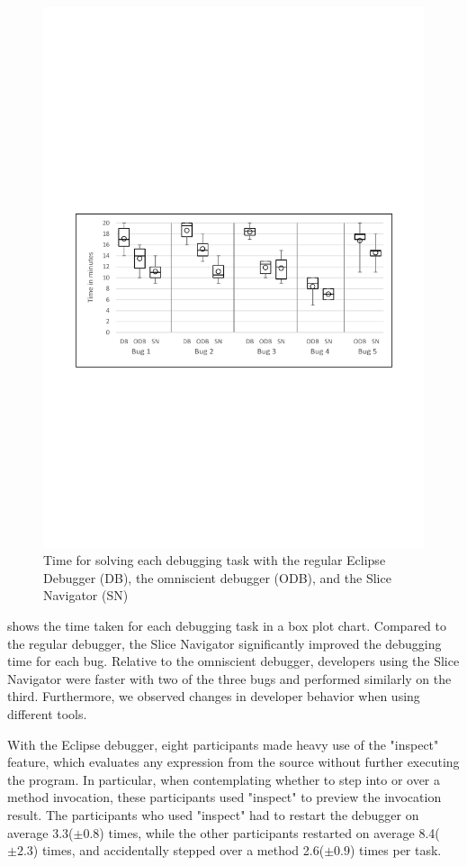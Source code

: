 \begin{figure}
	\centering
		\includegraphics[width=\linewidth, clip, trim={20mm 104mm 20mm 114mm}]{img/chart-times3.pdf}
	\caption{Time for solving each debugging task with the regular Eclipse Debugger (DB), the omniscient debugger (ODB), and the Slice Navigator (SN)}
	\label{fig:charttimes}
\end{figure}

 shows the time taken for each debugging task in a box plot chart.
Compared to the regular debugger, the Slice Navigator significantly improved the debugging time for each bug.
Relative to the omniscient debugger, developers using the Slice Navigator were faster with two of the three bugs and performed similarly on the third.
Furthermore, we observed changes in developer behavior when using different tools.

With the Eclipse debugger, eight participants made heavy use of the "inspect" feature, which evaluates any expression from the source without further executing the program.
In particular, when contemplating whether to step into or over a method invocation, these participants used "inspect" to preview the invocation result.
The participants who used "inspect" had to restart the debugger on average 3.3($\pm0.8$) times, while the other participants restarted on average 8.4($\pm2.3$) times, and accidentally stepped over a method 2.6($\pm0.9$) times per task.

